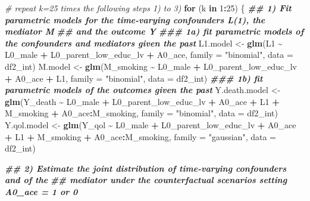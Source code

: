 \documentclass[
]{book}
\newenvironment{Shaded}{\begin{snugshade}}{\end{snugshade}}
\newcommand{\AttributeTok}[1]{\textcolor[rgb]{0.13,0.29,0.53}{#1}}
\newcommand{\CommentTok}[1]{\textcolor[rgb]{0.56,0.35,0.01}{\textit{#1}}}
\newcommand{\ControlFlowTok}[1]{\textcolor[rgb]{0.13,0.29,0.53}{\textbf{#1}}}
\newcommand{\DecValTok}[1]{\textcolor[rgb]{0.00,0.00,0.81}{#1}}
\newcommand{\DocumentationTok}[1]{\textcolor[rgb]{0.56,0.35,0.01}{\textbf{\textit{#1}}}}
\newcommand{\FunctionTok}[1]{\textcolor[rgb]{0.13,0.29,0.53}{\textbf{#1}}}
\newcommand{\NormalTok}[1]{#1}
\newcommand{\OtherTok}[1]{\textcolor[rgb]{0.56,0.35,0.01}{#1}}
\newcommand{\SpecialCharTok}[1]{\textcolor[rgb]{0.81,0.36,0.00}{\textbf{#1}}}
\newcommand{\StringTok}[1]{\textcolor[rgb]{0.31,0.60,0.02}{#1}}
\begin{document}
\begin{Shaded}
\begin{Highlighting}[]
\CommentTok{\# repeat k=25 times the following steps 1) to 3)}
\ControlFlowTok{for}\NormalTok{ (k }\ControlFlowTok{in} \DecValTok{1}\SpecialCharTok{:}\DecValTok{25}\NormalTok{) \{}
  \DocumentationTok{\#\# 1) Fit parametric models for the time{-}varying confounders L(1), the mediator M}
  \DocumentationTok{\#\#    and the outcome Y}
  \DocumentationTok{\#\#\# 1a) fit parametric models of the confounders and mediators given the past}
\NormalTok{  L1.model }\OtherTok{\textless{}{-}} \FunctionTok{glm}\NormalTok{(L1 }\SpecialCharTok{\textasciitilde{}}\NormalTok{ L0\_male }\SpecialCharTok{+}\NormalTok{ L0\_parent\_low\_educ\_lv }\SpecialCharTok{+}\NormalTok{ A0\_ace,}
                  \AttributeTok{family =} \StringTok{"binomial"}\NormalTok{, }\AttributeTok{data =}\NormalTok{ df2\_int)}
\NormalTok{  M.model }\OtherTok{\textless{}{-}} \FunctionTok{glm}\NormalTok{(M\_smoking }\SpecialCharTok{\textasciitilde{}}\NormalTok{ L0\_male }\SpecialCharTok{+}\NormalTok{ L0\_parent\_low\_educ\_lv }\SpecialCharTok{+}\NormalTok{ A0\_ace }\SpecialCharTok{+}\NormalTok{ L1,}
                 \AttributeTok{family =} \StringTok{"binomial"}\NormalTok{, }\AttributeTok{data =}\NormalTok{ df2\_int)}
  \DocumentationTok{\#\#\# 1b) fit parametric models of the outcomes given the past}
\NormalTok{  Y.death.model }\OtherTok{\textless{}{-}} \FunctionTok{glm}\NormalTok{(Y\_death }\SpecialCharTok{\textasciitilde{}}\NormalTok{ L0\_male }\SpecialCharTok{+}\NormalTok{ L0\_parent\_low\_educ\_lv }\SpecialCharTok{+}\NormalTok{ A0\_ace }\SpecialCharTok{+}\NormalTok{ L1 }\SpecialCharTok{+}
\NormalTok{                         M\_smoking }\SpecialCharTok{+}\NormalTok{ A0\_ace}\SpecialCharTok{:}\NormalTok{M\_smoking,}
                       \AttributeTok{family =} \StringTok{"binomial"}\NormalTok{, }\AttributeTok{data =}\NormalTok{ df2\_int)}
\NormalTok{  Y.qol.model }\OtherTok{\textless{}{-}} \FunctionTok{glm}\NormalTok{(Y\_qol }\SpecialCharTok{\textasciitilde{}}\NormalTok{ L0\_male }\SpecialCharTok{+}\NormalTok{ L0\_parent\_low\_educ\_lv }\SpecialCharTok{+}\NormalTok{ A0\_ace }\SpecialCharTok{+}\NormalTok{ L1 }\SpecialCharTok{+}
\NormalTok{                       M\_smoking }\SpecialCharTok{+}\NormalTok{ A0\_ace}\SpecialCharTok{:}\NormalTok{M\_smoking,}
                     \AttributeTok{family =} \StringTok{"gaussian"}\NormalTok{, }\AttributeTok{data =}\NormalTok{ df2\_int)}

  \DocumentationTok{\#\# 2) Estimate the joint distribution of time{-}varying confounders and of the}
  \DocumentationTok{\#\#    mediator under the counterfactual scenarios setting A0\_ace = 1 or 0}


\end{Highlighting}
\end{Shaded}
\end{document}
